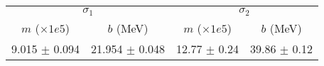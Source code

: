 \begin{tabular}{cc|cc}
\multicolumn{2}{c|}{$\sigma_1$} & \multicolumn{2}{|c}{$\sigma_2$} \\
$m$ ($\times1e5$) & $b$ (MeV) & $m$ ($\times1e5$) & $b$ (MeV) \\
\hline
9.015 $\pm$ 0.094 & 21.954 $\pm$ 0.048 & 12.77 $\pm$ 0.24 & 39.86 $\pm$ 0.12\\
\end{tabular}
